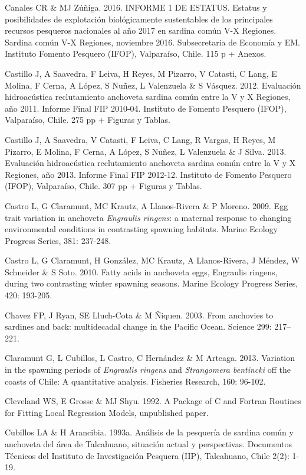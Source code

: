 \documentclass[
  spanish,
]{article}
\begin{document}
Canales CR \& MJ Zúñiga. 2016. INFORME 1 DE ESTATUS. Estatus y
posibilidades de explotación biológicamente sustentables de los
principales recursos pesqueros nacionales al año 2017 en sardina común
V-X Regiones. Sardina común V-X Regiones, noviembre 2016. Subsecretaria
de Economía y EM. Instituto Fomento Pesquero (IFOP), Valparaíso, Chile.
115 p + Anexos.

Castillo J, A Saavedra, F Leiva, H Reyes, M Pizarro, V Catasti, C Lang,
E Molina, F Cerna, A López, S Nuñez, L Valenzuela \& S Vásquez. 2012.
Evaluación hidroacústica reclutamiento anchoveta sardina común entre la
V y X Regiones, año 2011. Informe Final FIP 2010-04. Instituto de
Fomento Pesquero (IFOP), Valparaíso, Chile. 275 pp + Figuras y Tablas.

Castillo J, A Saavedra, V Catasti, F Leiva, C Lang, R Vargas, H Reyes, M
Pizarro, E Molina, F Cerna, A López, S Nuñez, L Valenzuela \& J Silva.
2013. Evaluación hidroacústica reclutamiento anchoveta sardina común
entre la V y X Regiones, año 2013. Informe Final FIP 2012-12. Instituto
de Fomento Pesquero (IFOP), Valparaíso, Chile. 307 pp + Figuras y
Tablas.

Castro L, G Claramunt, MC Krautz, A Llanos-Rivera \& P Moreno. 2009. Egg
trait variation in anchoveta \emph{Engraulis ringens}: a maternal
response to changing environmental conditions in contrasting spawning
habitats. Marine Ecology Progress Series, 381: 237-248.

Castro L, G Claramunt, H González, MC Krautz, A Llanos-Rivera, J Méndez,
W Schneider \& S Soto. 2010. Fatty acids in anchoveta eggs, Engraulis
ringens, during two contrasting winter spawning seasons. Marine Ecology
Progress Series, 420: 193-205.

Chavez FP, J Ryan, SE Lluch-Cota \& M Ñiquen. 2003. From anchovies to
sardines and back: multidecadal change in the Pacific Ocean. Science
299: 217--221.

Claramunt G, L Cubillos, L Castro, C Hernández \& M Arteaga. 2013.
Variation in the spawning periods of \emph{Engraulis ringens} and
\emph{Strangomera bentincki} off the coasts of Chile: A quantitative
analysis. Fisheries Research, 160: 96-102.

Cleveland WS, E Grosse \& MJ Shyu. 1992. A Package of C and Fortran
Routines for Fitting Local Regression Models, unpublished paper.

Cubillos LA \& H Arancibia. 1993a. Análisis de la pesquería de sardina
común y anchoveta del área de Talcahuano, situación actual y
perspectivas. Documentos Técnicos del Instituto de Investigación
Pesquera (IIP), Talcahuano, Chile 2(2): 1-19.
\end{document}
